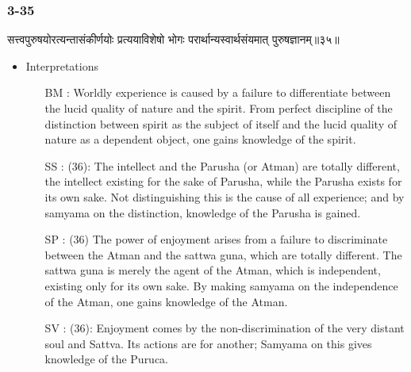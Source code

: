 \begin{frame}[fragile]\frametitle{3-35}
\begin{sanskrit}
सत्त्वपुरुषयोरत्यन्तासंकीर्णयोः प्रत्ययाविशेषो भोगः परार्थान्यस्वार्थसंयमात् पुरुषज्ञानम्॥३५॥
\end{sanskrit}

	\begin{itemize}
	\item Interpretations
		\begin{itemize}	

		\item [BM]: Worldly experience is caused by a failure to differentiate between the lucid quality of nature and the spirit. From perfect discipline of the distinction between spirit as the subject of itself and the lucid quality of nature as a dependent object, one gains knowledge of the spirit.
		\item [SS]: (36): The intellect and the Parusha (or Atman) are totally different, the intellect existing for the sake of Parusha, while the Parusha exists for its own sake. Not distinguishing this is the cause of all experience; and by samyama on the distinction, knowledge of the Parusha is gained.
		\item [SP]: (36) The power of enjoyment arises from a failure to discriminate between the Atman and the sattwa guna, which are totally different. The sattwa guna is merely the agent of the Atman, which is independent, existing only for its own sake. By making samyama on the independence of the Atman, one gains knowledge of the Atman.
		\item [SV]: (36): Enjoyment comes by the non-discrimination of the very distant soul and Sattva. Its actions are for another; Samyama on this gives knowledge of the Puruca. 
		\end{itemize}
	\end{itemize}
\end{frame}



